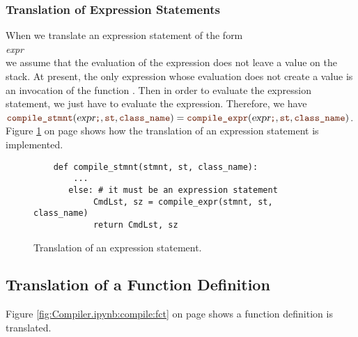 \subsubsection{Translation of Expression Statements}
When we translate an expression statement of the form
\\[0.2cm]
\hspace*{1.3cm}
\textsl{expr} \mytt{;}
\\[0.2cm]
we assume that the evaluation of the expression does not leave a value on the stack.
At present, the only expression whose evaluation does not create a value is an invocation of the function
.  Then in order to evaluate the expression statement, we just have to evaluate the expression.
Therefore, we have
\\[0.2cm]
\hspace*{1.3cm}
$\mytt{compile\_stmnt}(\textsl{expr}\mytt{;}, \mytt{st}, \mytt{class\_name})
=  \mytt{compile\_expr}(\textsl{expr}\mytt{;}, \mytt{st}, \mytt{class\_name})$.
\\[0.2cm]
Figure \ref{fig:Compiler.ipynb:compile:expr_stmnt} on page \pageref{fig:Compiler.ipynb:compile:expr_stmnt} shows how the
translation of an expression statement is implemented.

\begin{figure}[!ht]
\centering
\begin{verbatim}
    def compile_stmnt(stmnt, st, class_name):
        ...
       else: # it must be an expression statement
            CmdLst, sz = compile_expr(stmnt, st, class_name)
            return CmdLst, sz
\end{verbatim}
\vspace*{-0.3cm}
\caption{Translation of an expression statement.}
\label{fig:Compiler.ipynb:compile:expr_stmnt}
\end{figure}


\subsection{Translation of a Function Definition}
Figure \ref{fig:Compiler.ipynb:compile:fct} on page \pageref{fig:Compiler.ipynb:compile:fct} shows a
function definition is translated.  

